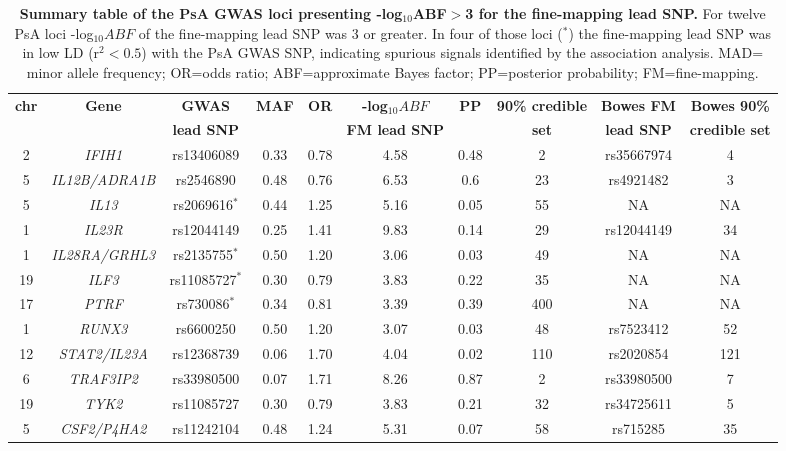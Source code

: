 \begin{landscape}
\begin{center}
\begin{longtable}[ht]{c c c c c c c c c c}
\caption[Summary table of the PsA GWAS loci presenting -log${_10}ABF>3$ for the fine-mapping lead SNP.]{\textbf{Summary table of the PsA GWAS loci presenting -log${_10}$ABF$>$3 for the fine-mapping lead SNP.} For twelve PsA loci -log${_10}ABF$ of the fine-mapping lead SNP was 3 or greater. In four of those loci ($^{\ast}$) the fine-mapping lead SNP was in low LD (r${^2}<0.5$) with the PsA GWAS SNP, indicating spurious signals identified by the association analysis. MAD= minor allele frequency; OR=odds ratio; ABF=approximate Bayes factor; PP=posterior probability; FM=fine-mapping.}
\label{tab:PsA_fine_mapping_summary} \\
\toprule
\textbf{chr} & \textbf{Gene} & \textbf{GWAS} & \textbf{MAF} & \textbf{OR} & \textbf{-log${_10}ABF$} & \textbf{PP} & \textbf{90\% credible} &\textbf{Bowes FM} & \textbf{Bowes 90\%}\\
    & & \textbf{lead SNP} & & & \textbf{FM lead SNP} &  & \textbf{set} &\textbf{lead SNP} & \textbf{credible set} \\
\midrule
\midrule
2	 &\textit{IFIH1}	       & rs13406089	&0.33	&0.78	&4.58	&0.48	&2	&rs35667974	&4 \\
5	 &\textit{IL12B/ADRA1B}  & rs2546890	&0.48	&0.76	&6.53	&0.6	&23	&rs4921482	&3 \\
5	 &\textit{IL13}	         &rs2069616$^{\ast}$	  &0.44	&1.25	&5.16	&0.05	&55	&NA	 &NA \\
1	 &\textit{IL23R}	       &rs12044149	&0.25	&1.41	&9.83	&0.14	&29	&rs12044149	&34 \\
1	 &\textit{IL28RA/GRHL3}  &rs2135755$^{\ast}$	&0.50	&1.20	&3.06	&0.03	&49	&NA	&NA \\
19 &\textit{ILF3}	         &rs11085727$^{\ast}$	&0.30	&0.79	&3.83	&0.22	&35	&NA	&NA \\
17 &\textit{PTRF}          &rs730086$^{\ast}$ &0.34 &0.81 &3.39 &0.39 &400	&NA	&NA \\
1	 & \textit{RUNX3}	       & rs6600250	&0.50	&1.20	&3.07	&0.03	&48	&rs7523412	&52 \\
12 &\textit{STAT2/IL23A}	 &rs12368739	&0.06	&1.70	&4.04	&0.02	&110 &	rs2020854	&121 \\
6	 & \textit{TRAF3IP2}	   &rs33980500	&0.07	&1.71	&8.26	&0.87	&2	&rs33980500	&7 \\
19 &	\textit{TYK2}	       &rs11085727	&0.30	&0.79	&3.83	&0.21	&32	&rs34725611	&5 \\
5	 & \textit{CSF2/P4HA2}	 &rs11242104  &0.48 &1.24 &5.31 &0.07 &58	&rs715285 &35 \\
\bottomrule
\end{longtable}
\end{center}
\end{landscape}



